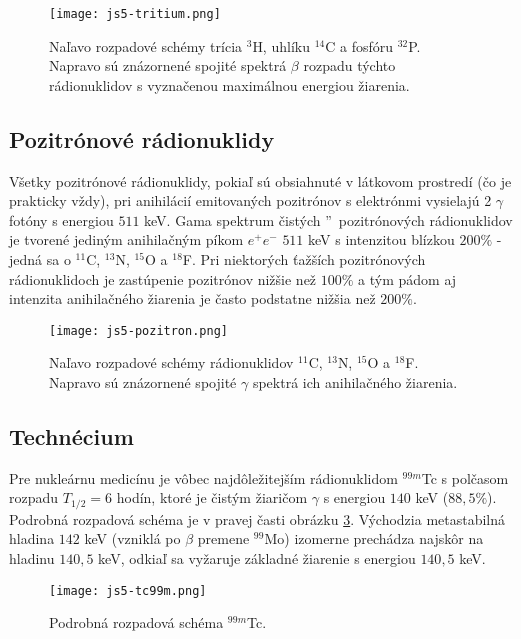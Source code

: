 \documentclass[../../main.tex]{subfiles}
\begin{document}
\begin{figure}[h]
\centering
\texttt{[image: js5-tritium.png]}
\caption{Naľavo rozpadové schémy trícia $^3$H, uhlíku $^{14}$C a fosfóru $^{32}$P. Napravo sú znázornené spojité spektrá $\beta$ rozpadu týchto rádionuklidov s vyznačenou maximálnou energiou žiarenia.}
\label{js5:img:tritium}
\end{figure}

\subsection{Pozitrónové rádionuklidy}

Všetky pozitrónové rádionuklidy, pokiaľ sú obsiahnuté v látkovom prostredí (čo je prakticky vždy), pri anihilácií emitovaných pozitrónov s elektrónmi vysielajú 2 $\gamma$ fotóny s energiou $511$ keV. Gama spektrum \quotedblbase čistých \textquotedblright ~pozitrónových rádionuklidov je tvorené jediným anihilačným píkom $e^+e^-$ $511$ keV s intenzitou blízkou $200\%$ - jedná sa o $^{11}$C, $^{13}$N, $^{15}$O a $^{18}$F. Pri niektorých ťažších pozitrónových rádionuklidoch je zastúpenie pozitrónov nižšie než $100\%$ a tým pádom aj intenzita anihilačného žiarenia je často podstatne nižšia než $200\%$.

\begin{figure}[h]
\centering
\texttt{[image: js5-pozitron.png]}
\caption{Naľavo rozpadové schémy rádionuklidov $^{11}$C, $^{13}$N, $^{15}$O a $^{18}$F. Napravo sú znázornené spojité $\gamma$ spektrá ich anihilačného žiarenia.}
\label{js5:img:pozitron}
\end{figure}

\subsection{Technécium}

Pre nukleárnu medicínu je vôbec najdôležitejším rádionuklidom $^{99m}$Tc s polčasom rozpadu $T_{1/2}=6$ hodín, ktoré je čistým žiaričom $\gamma$ s energiou $140$ keV ($88,5\%$). Podrobná rozpadová schéma je v pravej časti obrázku \ref{js5:img:tc99m}. Východzia metastabilná hladina $142$ keV (vzniklá po $\beta$ premene $^{99}$Mo) izomerne prechádza najskôr na hladinu $140,5$ keV, odkiaľ sa vyžaruje základné žiarenie s energiou $140,5$ keV.

\begin{figure}[h]
\centering
\texttt{[image: js5-tc99m.png]}
\caption{Podrobná rozpadová schéma $^{99m}$Tc.}
\label{js5:img:tc99m}
\end{figure}
\end{document}
